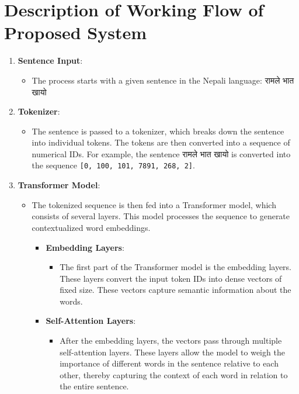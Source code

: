 \section{Description of Working Flow of Proposed System}
\begin{enumerate}
    \item \textbf{Sentence Input}:
    \begin{itemize}
        \item The process starts with a given sentence in the Nepali language: \textsanskrit{रामले भात खायो}
    \end{itemize}
    
    \item \textbf{Tokenizer}:
    \begin{itemize}
        \item The sentence is passed to a tokenizer, which breaks down the sentence into individual tokens. The tokens are then converted into a sequence of numerical IDs. For example, the sentence \textsanskrit{रामले भात खायो} is converted into the sequence \texttt{[0, 100, 101, 7891, 268, 2]}.
    \end{itemize}
    
    \item \textbf{Transformer Model}:
    \begin{itemize}
        \item The tokenized sequence is then fed into a Transformer model, which consists of several layers. This model processes the sequence to generate contextualized word embeddings.
        
        \begin{itemize}
            \item \textbf{Embedding Layers}:
            \begin{itemize}
                \item The first part of the Transformer model is the embedding layers. These layers convert the input token IDs into dense vectors of fixed size. These vectors capture semantic information about the words.
            \end{itemize}
            
            \item \textbf{Self-Attention Layers}:
            \begin{itemize}
                \item After the embedding layers, the vectors pass through multiple self-attention layers. These layers allow the model to weigh the importance of different words in the sentence relative to each other, thereby capturing the context of each word in relation to the entire sentence.
            \end{itemize}
        \end{itemize}
    \end{itemize}
    

\end{enumerate}
